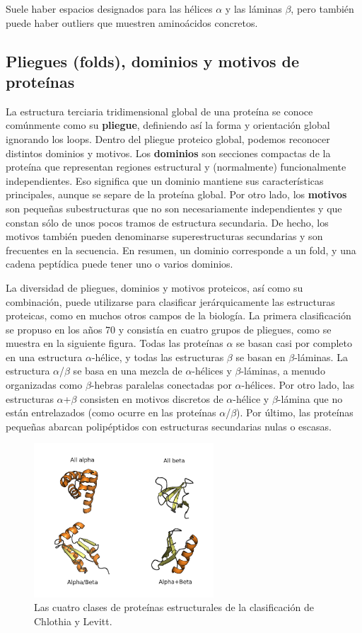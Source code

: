 Suele haber espacios designados para las hélices $\alpha$ y las láminas $\beta$, pero también puede haber outliers que muestren aminoácidos concretos.

\subsection{Pliegues (folds), dominios y motivos de proteínas}
La estructura terciaria tridimensional global de una proteína se conoce comúnmente como su \textbf{pliegue}, definiendo así la forma y orientación global ignorando los loops. Dentro del pliegue proteico global, podemos reconocer distintos dominios y motivos. Los \textbf{dominios} son secciones compactas de la proteína que representan regiones estructural y (normalmente) funcionalmente independientes. Eso significa que un dominio mantiene sus características principales, aunque se separe de la proteína global. Por otro lado, los \textbf{motivos} son pequeñas subestructuras que no son necesariamente independientes y que constan sólo de unos pocos tramos de estructura secundaria. De hecho, los motivos también pueden denominarse superestructuras secundarias y son frecuentes en la secuencia. En resumen, un dominio corresponde a un fold, y una cadena peptídica puede tener uno o varios dominios.

La diversidad de pliegues, dominios y motivos proteicos, así como su combinación, puede utilizarse para clasificar jerárquicamente las estructuras proteicas, como en muchos otros campos de la biología. La primera clasificación se propuso en los años 70 y consistía en cuatro grupos de pliegues, como se muestra en la siguiente figura. Todas las proteínas $\alpha$ se basan casi por completo en una estructura $\alpha$-hélice, y todas las estructuras $\beta$ se basan en $\beta$-láminas. La estructura $\alpha$/$\beta$ se basa en una mezcla de $\alpha$-hélices y $\beta$-láminas, a menudo organizadas como $\beta$-hebras paralelas conectadas por $\alpha$-hélices. Por otro lado, las estructuras $\alpha$+$\beta$ consisten en motivos discretos de $\alpha$-hélice y $\beta$-lámina que no están entrelazados (como ocurre en las proteínas $\alpha$/$\beta$). Por último, las proteínas pequeñas abarcan polipéptidos con estructuras secundarias nulas o escasas.

\begin{figure}[h]
\centering
\includegraphics[width = 0.6\textwidth]{figs/clasif.png}
\caption{Las cuatro clases de proteínas estructurales de la clasificación de Chlothia y Levitt.}
\label{fig:alphabeta}
\end{figure}